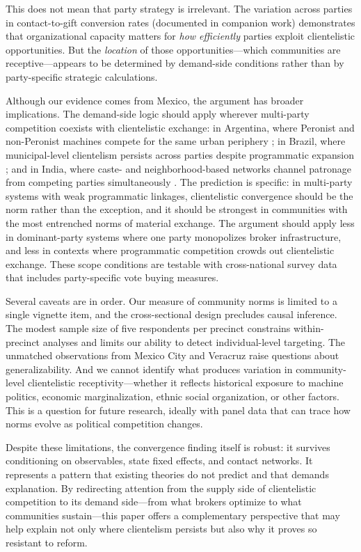 \documentclass[12pt,letterpaper]{article}
\begin{document}
This does not mean that party strategy is irrelevant. The variation across parties in contact-to-gift conversion rates (documented in companion work) demonstrates that organizational capacity matters for \textit{how efficiently} parties exploit clientelistic opportunities. But the \textit{location} of those opportunities---which communities are receptive---appears to be determined by demand-side conditions rather than by party-specific strategic calculations.

Although our evidence comes from Mexico, the argument has broader implications. The demand-side logic should apply wherever multi-party competition coexists with clientelistic exchange: in Argentina, where Peronist and non-Peronist machines compete for the same urban periphery \citep{stokes2013brokers, zarazaga2014brokers}; in Brazil, where municipal-level clientelism persists across parties despite programmatic expansion \citep{nichter2018votes}; and in India, where caste- and neighborhood-based networks channel patronage from competing parties simultaneously \citep{kitschelt2007patrons}. The prediction is specific: in multi-party systems with weak programmatic linkages, clientelistic convergence should be the norm rather than the exception, and it should be strongest in communities with the most entrenched norms of material exchange. The argument should apply less in dominant-party systems where one party monopolizes broker infrastructure, and less in contexts where programmatic competition crowds out clientelistic exchange. These scope conditions are testable with cross-national survey data that includes party-specific vote buying measures.

Several caveats are in order. Our measure of community norms is limited to a single vignette item, and the cross-sectional design precludes causal inference. The modest sample size of five respondents per precinct constrains within-precinct analyses and limits our ability to detect individual-level targeting. The unmatched observations from Mexico City and Veracruz raise questions about generalizability. And we cannot identify what produces variation in community-level clientelistic receptivity---whether it reflects historical exposure to machine politics, economic marginalization, ethnic social organization, or other factors. This is a question for future research, ideally with panel data that can trace how norms evolve as political competition changes.

Despite these limitations, the convergence finding itself is robust: it survives conditioning on observables, state fixed effects, and contact networks. It represents a pattern that existing theories do not predict and that demands explanation. By redirecting attention from the supply side of clientelistic competition to its demand side---from what brokers optimize to what communities sustain---this paper offers a complementary perspective that may help explain not only where clientelism persists but also why it proves so resistant to reform.
\end{document}
